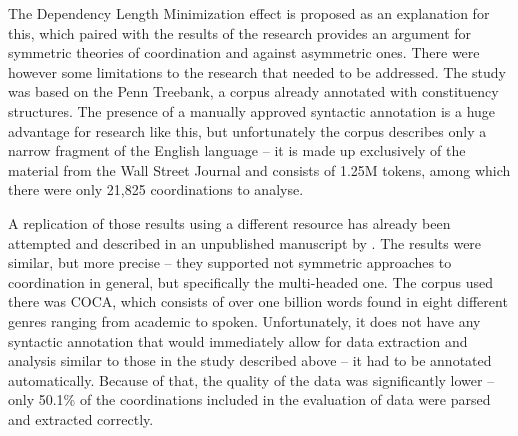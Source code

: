 
The Dependency Length Minimization effect is proposed as an explanation for this, which paired with the results of the research provides an argument for symmetric theories of coordination and against asymmetric ones. There were however some limitations to the research that needed to be addressed. The study was based on the Penn Treebank, a corpus already annotated with constituency structures. The presence of a manually approved syntactic annotation is a huge advantage for research like this, but unfortunately the corpus describes only a narrow fragment of the English language -- it is made up exclusively of the material from the Wall Street Journal and consists of 1.25M tokens, among which there were only 21,825 coordinations to analyse.


A replication of those results using a different resource has already been attempted and described in an unpublished manuscript by \cite{pbg2023}. The results were similar, but more precise -- they supported not symmetric approaches to coordination in general, but specifically the multi-headed one. The corpus used there was COCA, which consists of over one billion words found in eight different genres ranging from academic to spoken. Unfortunately, it does not have any syntactic annotation that would immediately allow for data extraction and analysis similar to those in the study described above -- it had to be annotated automatically. Because of that, the quality of the data was significantly lower -- only 50.1\% of the coordinations included in the evaluation of data were parsed and extracted correctly. 

